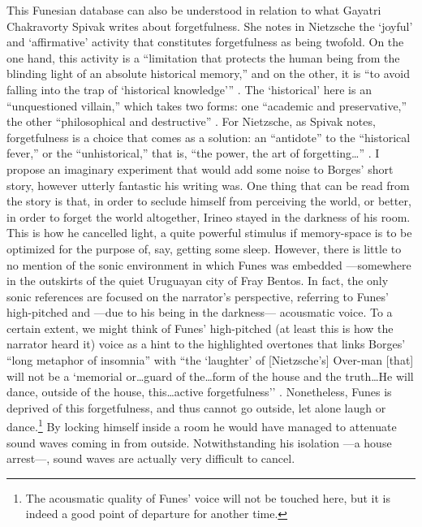 This Funesian database can also be understood in relation to what Gayatri Chakravorty Spivak \parencite{Der76:Of} writes about forgetfulness. She notes in Nietzsche the `joyful' and `affirmative' activity that constitutes forgetfulness as being twofold. On the one hand, this activity is a ``limitation that protects the human being from the blinding light of an absolute historical memory,'' and on the other, it is ``to avoid falling into the trap of `historical knowledge''' \parencite[xxxi]{Der76:Of}. The `historical' here is an ``unquestioned villain,'' which takes two forms: one ``academic and preservative,'' the other ``philosophical and destructive'' \parencite[xxxi]{Der76:Of}. For Nietzsche, as Spivak notes, forgetfulness is a choice that comes as a solution: an ``antidote'' to the ``historical fever,'' or the ``unhistorical,'' that is, ``the power, the art of forgetting\dots'' \parencite[xxxi]{Der76:Of}. I propose an imaginary experiment that would add some noise to Borges' short story, however utterly fantastic his writing was. One thing that can be read from the story is that, in order to seclude himself from perceiving the world, or better, in order to forget the world altogether, Irineo stayed in the darkness of his room. This is how he cancelled light, a quite powerful stimulus if memory-space is to be optimized for the purpose of, say, getting some sleep. However, there is little to no mention of the sonic environment in which Funes was embedded ---somewhere in the outskirts of the quiet Uruguayan city of Fray Bentos. In fact, the only sonic references are focused on the narrator's perspective, referring to Funes' high-pitched and ---due to his being in the darkness--- acousmatic voice. To a certain extent, we might think of Funes' high-pitched (at least this is how the narrator heard it) voice as a hint to the highlighted overtones that links Borges' ``long metaphor of insomnia'' with ``the `laughter' of [Nietzsche's] Over-man [that] will not be a `memorial or\dots guard of the\dots form of the house and the truth\dots He will dance, outside of the house, this\dots active forgetfulness'' \parencite[xxxii]{Der76:Of}. Nonetheless, Funes is deprived of this forgetfulness, and thus cannot go outside, let alone laugh or dance.\footnote{The acousmatic quality of Funes' voice will not be touched here, but it is indeed a good point of departure for another time.} By locking himself inside a room he would have managed to attenuate sound waves coming in from outside. Notwithstanding his isolation ---a house arrest---, sound waves are actually very difficult to cancel.


